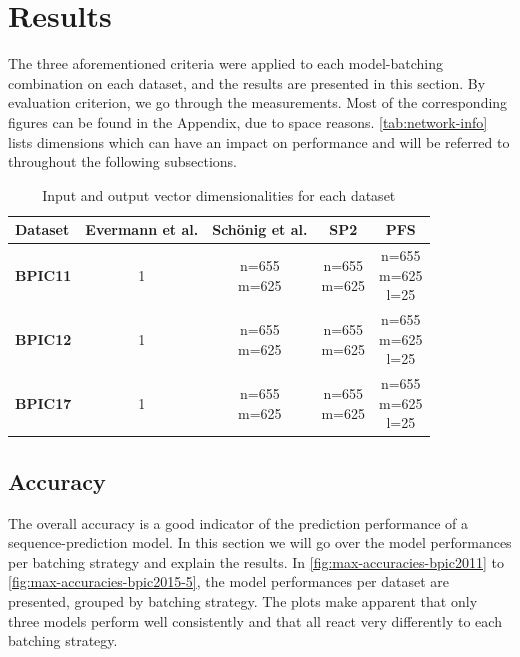 \section{Results}\label{sec:eval:results}
The three aforementioned criteria were applied to each model-batching combination on each dataset, and the results are presented in this section. By evaluation criterion, we go through the measurements. Most of the corresponding figures can be found in the Appendix, due to space reasons. \autoref{tab:network-info} lists dimensions which can have an impact on performance and will be referred to throughout the following subsections.

\begin{table}[htb!]
\centering
\begin{tabular}{lcccc}
\textbf{Dataset} & \textbf{Evermann et al.} & \textbf{Schönig et al.} & \textbf{SP2} & \textbf{PFS}\\
\hline
\hline
\textbf{BPIC11} & 1 & \makecell{n=655\\m=625} & \makecell{n=655\\m=625} & \makecell{n=655\\m=625\\ l=25} \\
\hline
\textbf{BPIC12} & 1 & \makecell{n=655\\m=625} & \makecell{n=655\\m=625} & \makecell{n=655\\m=625\\ l=25} \\
\hline
\textbf{BPIC17} & 1 & \makecell{n=655\\m=625} & \makecell{n=655\\m=625} & \makecell{n=655\\m=625\\ l=25} \\
\end{tabular}
\caption{Input and output vector dimensionalities for each dataset}
\label{tab:network-info}
\end{table}

\subsection*{Accuracy}
The overall accuracy is a good indicator of the prediction performance of a sequence-prediction model. In this section we will go over the model performances per batching strategy and explain the results. In \autoref{fig:max-accuracies-bpic2011} to \autoref{fig:max-accuracies-bpic2015-5}, the model performances per dataset are presented, grouped by batching strategy. The plots make apparent that only three models perform well consistently and that all react very differently to each batching strategy.

